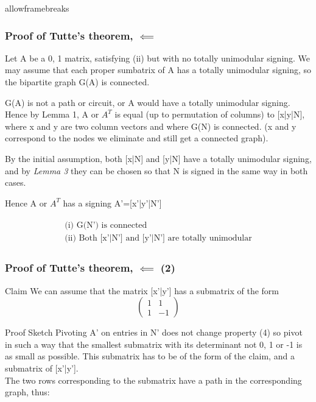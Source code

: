 \documentclass{beamer}
\begin{document}
\begin{frame}{allowframebreaks}
\frametitle{Proof of Tutte's theorem, $\impliedby$}
Let A be a {0, 1} matrix, satisfying (ii) but with no totally unimodular signing. We may assume that each proper sumbatrix of A has a totally unimodular signing, so the bipartite graph G(A) is connected.\par
G(A) is not a path or circuit, or A would have a totally unimodular signing. Hence by Lemma 1, A or $A^T$ is equal (up to permutation of columns) to [x|y|N], where x and y are two column vectors and where G(N) is connected. (x and y correspond to the nodes we eliminate and still get a connected graph).\par
By the initial assumption, both [x|N] and [y|N] have a totally unimodular signing, and by \emph{Lemma 3} they can be chosen so that N is signed in the same way in both cases.\par
Hence A or $A^T$ has a signing A'=[x'|y'|N']\par
\begin{gather}
\begin{aligned}
\text{(i) G(N') is connected}\\
\text{(ii) Both [x'|N'] and [y'|N'] are totally unimodular}
\end{aligned}
\end{gather}
\end{frame}

\begin{frame}
\frametitle{Proof of Tutte's theorem, $\impliedby$ (2)}
\begin{block}{Claim}
We can assume that the matrix [x'|y'] has a submatrix of the form
\begin{equation*}
\begin{pmatrix}
1 & 1 \\ 1 & -1
\end{pmatrix}
\end{equation*}
\end{block}
\begin{block}{Proof Sketch}
Pivoting A' on entries in N' does not change property (4) so pivot in such a way that the smallest submatrix with its determinant not 0, 1 or -1 is as small as possible. This submatrix has to be of the form of the claim, and a submatrix of [x'|y'].\\
The two rows corresponding to the submatrix have a path in the corresponding graph, thus:
\end{block}
\end{frame}
\end{document}
